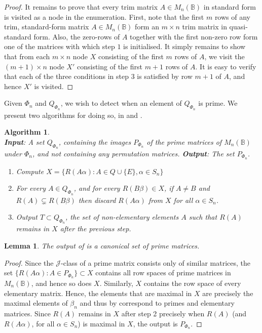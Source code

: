 \documentclass[11pt]{article}
\newtheorem{lemma}[thm]{Lemma}
\newtheorem{algo}[thm]{Algorithm}
\newenvironment{alg}{\begin{algo}\rm}{\end{algo}}
\numberwithin{equation}{section}
\newcommand{\set}[2]{\ensuremath{\{#1 : #2 \}}}
\newcommand{\B}{\mathbb{B}}
\newcommand{\Bn}{M_n(\B)}
\newcommand{\J}{\mathscr{J}}
\begin{document}
\begin{proof}
  It remains to prove that every trim matrix $A \in \Bn$ in standard form is
  visited as a node in the enumeration. First, note that the first $m$ rows of
  any trim, standard-form matrix $A \in \Bn$ form an $m \times n$ trim matrix in
  quasi-standard form. Also, the zero-rows of $A$ together with the first
  non-zero row form one of the matrices with which step $1$ is initialised. It
  simply remains to show that from each $m \times n$ node $X$ consisting of the
  first $m$ rows of $A$, we visit the $(m + 1)\times n$ node $X'$ consisting of
  the first $m + 1$ rows of $A$. It is easy to verify that each of the three
  conditions in step $3$ is satisfied by row $m + 1$ of $A$, and hence $X'$ is
  visited.
\end{proof}

Given $\Phi_n$ and $Q_{\Phi_n}$, we wish to detect when an element of $Q_{\Phi_n}$ is
prime. We present two algorithms for doing so, in  and
.

\begin{alg}
  \ \\
  \textbf{Input}: A set $Q_{\Phi_n}$, containing the images $P_{\Phi_n}$ of the
  prime matrices of $\Bn$ under $\Phi_n$, and not containing any permutation
  matrices.
  \textbf{Output}: The set $P_{\Phi_n}$.
  \begin{enumerate}
  \item 
    Compute $X = \set{R(A\alpha)}{A \in Q \cup \{E\}, \alpha \in S_n}$
  \item
    For every $A \in Q_{\Phi_n}$, and for every $R(B\beta) \in X$, if $A \neq B$ and
    $R(A) \subsetneq R(B\beta)$ then discard $R(A\alpha)$ from $X$ for all
    $\alpha \in S_n$.
  \item
    Output $T\subset Q_{\Phi_n}$, the set of non-elementary elements $A$ such that $R(A)$
    remains in $X$ after the previous step.
  \end{enumerate}
\end{alg}

\begin{lemma}
  The output of  is a canonical set of prime matrices.
\end{lemma}
\begin{proof}
  Since the $\J$-class of a prime matrix consists only of similar matrices, the
  set $\set{R(A\alpha)}{A \in P_{\Phi_n}} \subset X$ contains all row spaces of
  prime matrices in $\Bn$, and hence so does $X$. Similarly, $X$ contains the
  row space of every elementary matrix. Hence, the elements that are maximal in
  $X$ are precisely the maximal elements of $\beta_n$ and thus by
   correspond to primes and elementary matrices.
  Since $R(A)$ remains in $X$ after step 2 precisely when $R(A)$ (and
  $R(A\alpha)$, for all $\alpha \in S_n$) is maximal in $X$, the output is
  $P_{\Phi_n}$.
\end{proof} 
\end{document}
